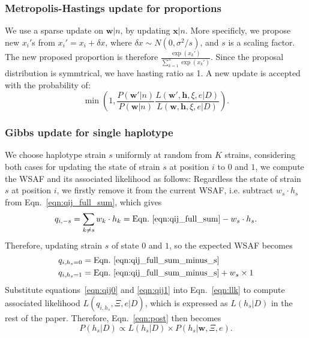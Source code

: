 \documentclass{bioinfo}
\begin{document}
\subsubsection{Metropolis-Hastings update for proportions}\label{sec:updateP}

We use a sparse update on $\mathbf{w}|n$, by updating $\mathbf{x}|n$. More specificly, we propose new $x_i'$s from $x_i' = x_i + \delta x$, where $\delta x \sim N(0, \sigma^2/s)$, and $s$ is a scaling factor. The new proposed proportion is therefore $\frac{\exp(x_k')}{\sum_{k=1}^n \exp(x_k')}$. Since the proposal distribution is symmtrical, we have hasting ratio as 1. A new update is accepted with the probability of:
 $$\min\left(1, \frac{P(\mathbf{w}'|n)}{P(\mathbf{w}|n)} \frac{L(\mathbf{w}', \mathbf{h},\xi, e|D)}{L(\mathbf{w}, \mathbf{h},\xi, e|D)}\right).$$


\subsubsection{Gibbs update for single haplotype}
We choose haplotype strain $s$ uniformly at random from $K$ strains, considering both cases for updating the state of strain $s$ at position $i$ to $0$ and $1$, we compute the WSAF and its associated likelihood as follows: Regardless the state of strain $s$ at position $i$, we firstly remove it from the current WSAF, i.e. subtract $ w_s \cdot h_s$ from Eqn.~\eqref{eqn:qij_full_sum}, which gives
\begin{equation}
q_{i,-s} = \sum_{k\neq s} w_k \cdot h_k = \textrm{Eqn.~\eqref{eqn:qij_full_sum}} -  w_s \cdot h_s. \label{eqn:qij_full_sum_minus_s}
\end{equation}
Therefore, updating strain $s$ of state $0$ and $1$, so the expected WSAF becomes
\begin{align}
q_{i,h_s=0} & = \textrm{Eqn.~\eqref{eqn:qij_full_sum_minus_s}} \label{eqn:qij0}\\
q_{i,h_s=1} & = \textrm{Eqn.~\eqref{eqn:qij_full_sum_minus_s}} + w_s \times 1 \label{eqn:qij1}
\end{align}
Substitute equations~\eqref{eqn:qij0} and \eqref{eqn:qij1} into Eqn.~\eqref{eqn:llk} to compute associated likelihood $L(q_{i,h_s}, \Xi, e |D)$, which is expressed as $L(h_s |D)$ in the rest of the paper. Therefore, Eqn.~\eqref{eqn:post} then becomes
\begin{equation}
P(h_s |D) \propto  L(h_s |D) \times P(h_s|\mathbf{w}, \Xi, e).\label{eqn:post_hs}
\end{equation}
\end{document}
